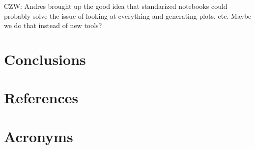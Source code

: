 \documentclass[DM,authoryear,toc]{lsstdoc}
\begin{document}
CZW: Andres brought up the good idea that standarized notebooks could probably solve the issue of looking at everything and generating plots, etc.  Maybe we do that instead of new tools?


\section{Conclusions}


\appendix
\section{References} \label{sec:bib}
\renewcommand{\refname}{} %


\section{Acronyms} \label{sec:acronyms}

\end{document}
